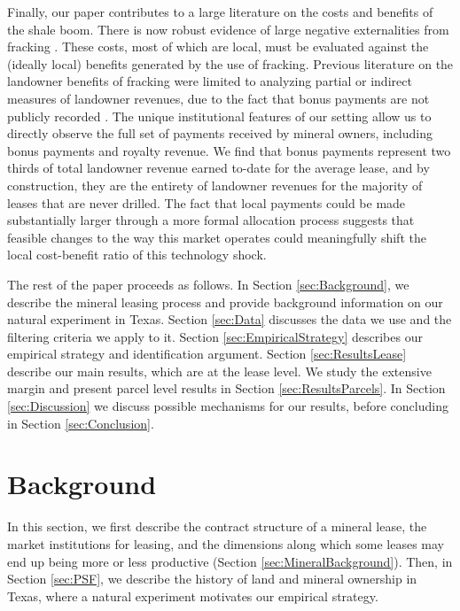 \documentclass[12pt]{article}
\begin{document}
Finally, our paper contributes to a large literature on the costs and benefits of the shale boom. There is now robust evidence of large negative externalities from fracking \citep{muehlenbachs_housing_2015,currie_hydraulic_2017}. These costs, most of which are local, must be evaluated against the (ideally local) benefits generated by the use of fracking. Previous literature on the landowner benefits of fracking were limited to analyzing partial or indirect measures of landowner revenues, due to the fact that bonus payments are not publicly recorded \citep{brown_capturing_2016,feyrer_geographic_2017,bartik_local_2017}. The unique institutional features of our setting allow us to directly observe the full set of payments received by mineral owners, including bonus payments and royalty revenue. We find that bonus payments represent two thirds of total landowner revenue earned to-date for the average lease, and by construction, they are the entirety of landowner revenues for the majority of leases that are never drilled. The fact that local payments could be made substantially larger through a more formal allocation process suggests that feasible changes to the way this market operates could meaningfully shift the local cost-benefit ratio of this technology shock.

The rest of the paper proceeds as follows. In Section \ref{sec:Background}, we describe the mineral leasing process and provide background information on our natural experiment in Texas. Section \ref{sec:Data} discusses the data we use and the filtering criteria we apply to it.  Section \ref{sec:EmpiricalStrategy} describes our empirical strategy and identification argument. Section \ref{sec:ResultsLease} describe our main results, which are at the lease level. We study the extensive margin and present parcel level results in Section \ref{sec:ResultsParcels}. In Section \ref{sec:Discussion} we discuss possible mechanisms for our results, before concluding in Section \ref{sec:Conclusion}. 

\section{Background \label{sec:Background}}
In this section, we first describe the contract structure of a mineral lease, the market institutions for leasing, and the dimensions along which some leases may end up being more or less productive (Section \ref{sec:MineralBackground}). Then, in Section \ref{sec:PSF}, we describe the history of land and mineral ownership in Texas, where a natural experiment motivates our empirical strategy.
\end{document}
